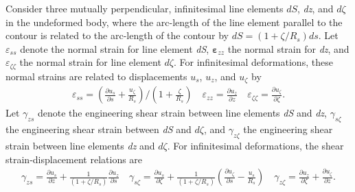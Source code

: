 \documentclass{AeroStructure-ERJohnson}
\begin{document}
Consider three mutually perpendicular, infinitesimal line elements $dS$, \textit{dz}, and $d\zeta$ in the undeformed body, where the arc-length of the line element parallel to the contour is related to the arc-length of the contour by $dS=\left(1+\zeta / R_{s}\right) ds$. Let $\varepsilon_{ss}$ denote the normal strain for line element \textit{dS}, $\boldsymbol{\varepsilon}_{zz}$ the normal strain for \textit{dz}, and $\varepsilon_{\zeta \zeta}$ the normal strain for line element $d\zeta$. For infinitesimal deformations, these normal strains are related to displacements $u_s$, $u_z$, and $u_{\zeta}$ by\vspace*{-8pt}
\begin{align}\label{eq3.27}
\varepsilon_{s s}=\left(\frac{\partial u_{s}}{\partial s}+\frac{u_{\zeta}}{R_{s}}\right) /\left(1+\frac{\zeta}{R_{s}}\right) \quad \varepsilon_{z z}=\frac{\partial u_{z}}{\partial z} \quad \varepsilon_{\zeta \zeta}=\frac{\partial u_{\zeta}}{\partial \zeta}.
\end{align}
Let $\gamma_{z s}$ denote the engineering shear strain between line elements \textit{dS} and \textit{dz}, $\gamma_{s \zeta}$ the engineering shear strain between \textit{dS} and $d\zeta$, and $\gamma_{z \zeta}$ the engineering shear strain between line elements \textit{dz} and $d\zeta$. For infinitesimal deformations, the shear strain-displacement relations are
\begin{align}\label{eq3.28}
\gamma_{z s}=\frac{\partial u_{s}}{\partial z}+\frac{1}{\left(1+\zeta / R_{s}\right)} \frac{\partial u_{z}}{\partial s} \quad \gamma_{s \zeta}=\frac{\partial u_{s}}{\partial \zeta}+\frac{1}{\left(1+\zeta / R_{s}\right)}\left(\frac{\partial u_{\zeta}}{\partial s}-\frac{u_{s}}{R_{s}}\right) \quad \gamma_{z \zeta}=\frac{\partial u_{z}}{\partial \zeta}+\frac{\partial u_{\zeta}}{\partial z}.
\end{align}

\removelastskip
\end{document}
